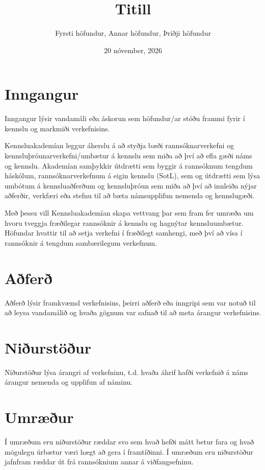 \documentclass{kennsluakademia_conf}
\date{20 nóvember, 2026}
\title{Titill}
\author{%
Fyrsti höfundur\autid{1}{0000-0000-0000-0000}, 
Annar höfundur\autid{1}{0000-0000-0000-0000}, 
Þriðji höfundur\autid{2}{0000-0000-0000-0000}%
}
\affil{1}{Deild, háskóli}
\affil{2}{Önnur deild, háskóli}
\begin{document}
\maketitle

\section{Inngangur}

Inngangur lýsir vandamáli eða áskorun sem höfundur/ar stóðu frammi fyrir í kennslu og markmiði verkefnisins.  

Kennsluakademían leggur áherslu á að styðja bæði rannsóknarverkefni og kennsluþróunarverkefni/umbætur á kennslu sem miða að því að efla gæði náms og kennslu. Akademían samþykkir  útdrætti sem byggir á rannsóknum tengdum háskólum, rannsóknarverkefnum á eigin kennslu (SotL), sem og útdrætti sem lýsa umbótum á kennsluaðferðum og kennsluþróun sem miða að því að innleiða nýjar aðferðir, verkfæri eða stefnu til að bæta námsupplifun nemenda og kennslugæði. 

Með þessu vill Kennsluakademían skapa vettvang þar sem fram fer umræða um hvoru tveggja fræðilegar rannsóknir á kennslu og hagnýtar kennsluumbætur.  Höfundar hvattir til að setja verkefni í fræðilegt samhengi, með því að vísa í rannsóknir á tengdum sambærilegum verkefnum.  

\section{Aðferð}

Aðferð lýsir framkvæmd verkefnisins, þeirri aðferð eða inngripi sem var notuð til að leysa vandamálið og hvaða gögnum var safnað til að meta árangur verkefnisins. 

\section{Niðurstöður}

Niðurstöður lýsa árangri af verkefninu, t.d. hvaða áhrif hafði verkefnið á náms árangur nemenda og upplifun af náminu.

\section{Umræður}

Í umræðum eru niðurstöður ræddar svo sem hvað hefði mátt betur fara og hvað mögulegu úrbætur væri hægt að gera í framtíðinni. Í umræðum eru niðurstöður jafnfram ræddar út frá rannsóknium annar á viðfangsefninu.  

\nocite{*}

  
  
\end{document}
